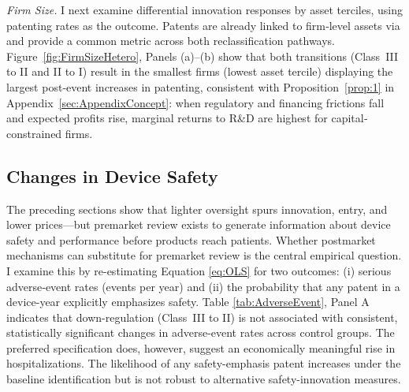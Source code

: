 \documentclass[letterpaper,12pt]{article}
\theoremstyle{definition}
\begin{document}
\textit{Firm Size.} I next examine differential innovation responses by asset terciles, using patenting rates as the outcome. Patents are already linked to firm‐level assets via \cite{kogan:2017} and provide a common metric across both reclassification pathways. Figure~\ref{fig:FirmSizeHetero}, Panels (a)--(b) show that both transitions (Class~III to II and II to I) result in the smallest firms (lowest asset tercile) displaying the largest post‐event increases in patenting, consistent with Proposition~\ref{prop:1} in Appendix~\ref{sec:AppendixConcept}: when regulatory and financing frictions fall and expected profits rise, marginal returns to R\&D are highest for capital‐constrained firms.\footnotemark {}
 


\subsection{Changes in Device Safety}\label{sec:adverseeventresults}

The preceding sections show that lighter oversight spurs innovation, entry, and lower prices---but premarket review exists to generate information about device safety and performance before products reach patients. Whether postmarket mechanisms can substitute for premarket review is the central empirical question. I examine this by re-estimating Equation \ref{eq:OLS} for two outcomes: (i) serious adverse‐event rates (events per year) and (ii) the probability that any patent in a device-year explicitly emphasizes safety. Table \ref{tab:AdverseEvent}, Panel A indicates that down-regulation (Class~III to II) is not associated with consistent, statistically significant changes in adverse-event rates across control groups.\footnotemark {} The preferred specification does, however, suggest an economically meaningful rise in hospitalizations. The likelihood of any safety-emphasis patent increases under the baseline identification but is not robust to alternative safety-innovation measures.\footnotemark {}
\end{document}
